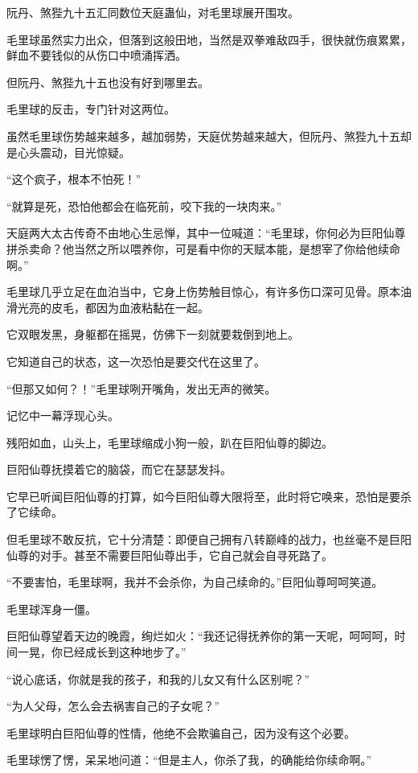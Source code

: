 \begin{this_body}
阮丹、煞狴九十五汇同数位天庭蛊仙，对毛里球展开围攻。

毛里球虽然实力出众，但落到这般田地，当然是双拳难敌四手，很快就伤痕累累，鲜血不要钱似的从伤口中喷涌挥洒。

但阮丹、煞狴九十五也没有好到哪里去。

毛里球的反击，专门针对这两位。

虽然毛里球伤势越来越多，越加弱势，天庭优势越来越大，但阮丹、煞狴九十五却是心头震动，目光惊疑。

“这个疯子，根本不怕死！”

“就算是死，恐怕他都会在临死前，咬下我的一块肉来。”

天庭两大太古传奇不由地心生忌惮，其中一位喊道：“毛里球，你何必为巨阳仙尊拼杀卖命？他当然之所以喂养你，可是看中你的天赋本能，是想宰了你给他续命啊。”

毛里球几乎立足在血泊当中，它身上伤势触目惊心，有许多伤口深可见骨。原本油滑光亮的皮毛，都因为血液粘黏在一起。

它双眼发黑，身躯都在摇晃，仿佛下一刻就要栽倒到地上。

它知道自己的状态，这一次恐怕是要交代在这里了。

“但那又如何？！”毛里球咧开嘴角，发出无声的微笑。

记忆中一幕浮现心头。

残阳如血，山头上，毛里球缩成小狗一般，趴在巨阳仙尊的脚边。

巨阳仙尊抚摸着它的脑袋，而它在瑟瑟发抖。

它早已听闻巨阳仙尊的打算，如今巨阳仙尊大限将至，此时将它唤来，恐怕是要杀了它续命。

但毛里球不敢反抗，它十分清楚：即便自己拥有八转巅峰的战力，也丝毫不是巨阳仙尊的对手。甚至不需要巨阳仙尊出手，它自己就会自寻死路了。

“不要害怕，毛里球啊，我并不会杀你，为自己续命的。”巨阳仙尊呵呵笑道。

毛里球浑身一僵。

巨阳仙尊望着天边的晚霞，绚烂如火：“我还记得抚养你的第一天呢，呵呵呵，时间一晃，你已经成长到这种地步了。”

“说心底话，你就是我的孩子，和我的儿女又有什么区别呢？”

“为人父母，怎么会去祸害自己的子女呢？”

毛里球明白巨阳仙尊的性情，他绝不会欺骗自己，因为没有这个必要。

毛里球愣了愣，呆呆地问道：“但是主人，你杀了我，的确能给你续命啊。”


\end{this_body}
